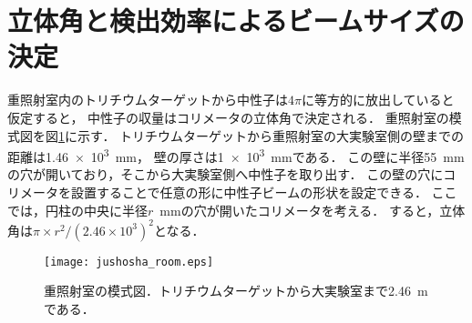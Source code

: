 \documentclass[../master]{subfiles}
\begin{document}
\section{立体角と検出効率によるビームサイズの決定}
重照射室内のトリチウムターゲットから中性子は$4\pi$に等方的に放出していると仮定すると，
中性子の収量はコリメータの立体角で決定される．
重照射室の模式図を図\ref{fig::jushosha_room}に示す．
トリチウムターゲットから重照射室の大実験室側の壁までの距離は\SI{1.46e3}{\milli\metre}，
壁の厚さは\SI{1e3}{\milli\metre}である．
この壁に半径\SI{55}{\milli\metre}の穴が開いており，そこから大実験室側へ中性子を取り出す．
この壁の穴にコリメータを設置することで任意の形に中性子ビームの形状を設定できる．
ここでは，円柱の中央に半径$r$~\si{\milli\metre}の穴が開いたコリメータを考える．
すると，立体角は$\pi\times r^2/\left(2.46\times10^3\right)^2$となる．
\begin{figure}
  \centering
  \texttt{[image: jushosha\_room.eps]}
  \caption{重照射室の模式図．トリチウムターゲットから大実験室まで\SI{2.46}{\metre}である．}
  \label{fig::jushosha_room}
\end{figure}
\end{document}

